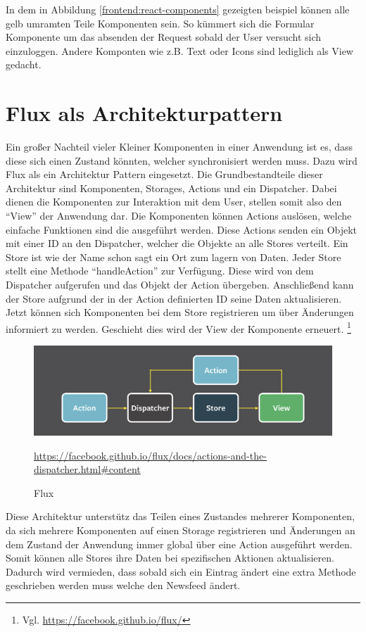 In dem in Abbildung \ref{frontend:react-components} gezeigten beispiel können alle gelb umramten Teile Komponenten sein.
So kümmert sich die Formular Komponente um das absenden der Request sobald der User versucht sich einzuloggen. 
Andere Komponten wie z.B. Text oder Icons sind lediglich als View gedacht.

\section{Flux als Architekturpattern}
Ein großer Nachteil vieler Kleiner Komponenten in einer Anwendung ist es, dass diese sich einen Zustand könnten, welcher synchronisiert werden muss.
Dazu wird Flux als ein Architektur Pattern eingesetzt.
Die Grundbestandteile dieser Architektur sind Komponenten, Storages, Actions und ein Dispatcher.
Dabei dienen die Komponenten zur Interaktion mit dem User, stellen somit also den \enquote{View} der Anwendung dar.
Die Komponenten können Actions auslösen, welche einfache Funktionen sind die ausgeführt werden.
Diese Actions senden ein Objekt mit einer ID an den Dispatcher, welcher die Objekte an alle Stores verteilt.
Ein Store ist wie der Name schon sagt ein Ort zum lagern von Daten. Jeder Store stellt eine Methode \enquote{handleAction} zur Verfügung.
Diese wird von dem Dispatcher aufgerufen und das Objekt der Action übergeben. 
Anschließend kann der Store aufgrund der in der Action definierten ID seine Daten aktualisieren.
Jetzt können sich Komponenten bei dem Store registrieren um über Änderungen informiert zu werden.
Geschieht dies wird der View der Komponente erneuert. \footnote{Vgl. \url{https://facebook.github.io/flux/}}
\begin{figure}[H]
    \includegraphics[width=\textwidth]{images/flux.png}
    \caption{Flux}
    \url{https://facebook.github.io/flux/docs/actions-and-the-dispatcher.html#content}
\end{figure}

Diese Architektur unterstütz das Teilen eines Zustandes mehrerer Komponenten, da sich mehrere Komponenten auf einen Storage registrieren 
und Änderungen an dem Zustand der Anwendung immer global über eine Action ausgeführt werden. Somit können alle Stores ihre Daten bei spezifischen Aktionen aktualisieren.
Dadurch wird vermieden, dass sobald sich ein Eintrag ändert eine extra Methode geschrieben werden muss welche den Newsfeed ändert.

